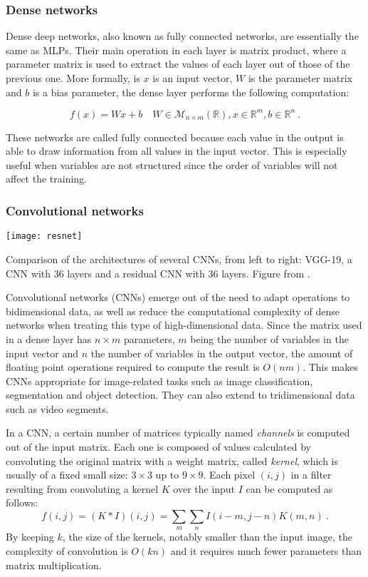 \subsubsection{Dense networks}

Dense deep networks, also known as fully connected networks, are essentially the same as MLPs. Their main operation in each layer is matrix product, where a parameter matrix is used to extract the values of each layer out of those of the previous one. More formally, is $x$ is an input vector, $W$ is the parameter matrix and $b$ is a bias parameter, the dense layer performs the following computation:

\begin{equation}
    f(x)=Wx + b\quad W\in \mathcal M_{n\times m}(\mathbb R), x\in\mathbb R^m, b\in\mathbb R^n~.
\end{equation}

These networks are called fully connected because each value in the output is able to draw information from all values in the input vector. This is especially useful when variables are not structured since the order of variables  will not affect the training.

\subsubsection{Convolutional networks}

\begin{marginfigure}
    \texttt{[image: resnet]}
    \caption{\label{fig:resnet}Comparison of the architectures of several CNNs, from left to right: VGG-19, a CNN with 36 layers and a residual CNN with 36 layers. Figure from \cite{he2016deep}.}
\end{marginfigure}


Convolutional networks (CNNs) emerge out of the need to adapt operations to bidimensional data, as well as reduce the computational complexity of dense networks when treating this type of high-dimensional data. Since the matrix used in a dense layer has $n\times m$ parameters, $m$ being the number of variables in the input vector and $n$ the number of variables in the output vector, the amount of floating point operations required to compute the result is $O\left(nm\right)$. This makes CNNs appropriate for image-related tasks such as image classification, segmentation and object detection. They can also extend to tridimensional data such as video segments.

In a CNN, a certain number of matrices typically named \textit{channels} is computed out of the input matrix. Each one is composed of values calculated by convoluting the original matrix with a weight matrix, called \textit{kernel}, which is usually of a fixed small size: $3\times 3$ up to $9\times 9$. Each pixel $(i, j)$ in a filter resulting from convoluting a kernel $K$ over the input $I$ can be computed as follows:
\begin{equation}
    f(i,j)=\left(K\ast I\right)(i,j)=\sum_{m}\sum_{n}I(i-m,j-n)K(m,n)~.
\end{equation}
By keeping $k$, the size of the kernels, notably smaller than the input image, the complexity of convolution is $O(kn)$ and it requires much fewer parameters than matrix multiplication.

